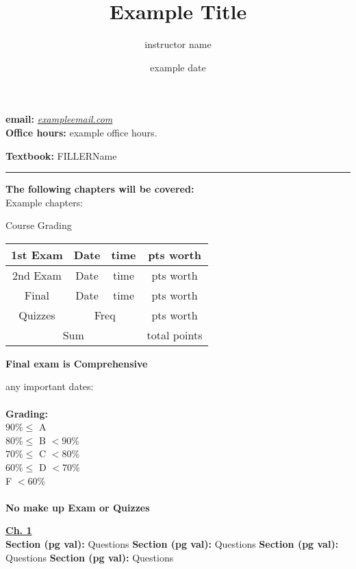 \documentclass[12pt, letterpaper]{article}
\title{Example Title}
\date{example date}
\author{instructor name}
\begin{document}
\maketitle

\textbf{email:} \href{mailto:exampleemail.com}{\color{blue}\emph{exampleemail.com}}\\
\textbf{Office hours:} example office hours.

\textbf{Textbook:} FILLERName\\
\noindent\rule{\textwidth}{0.4pt}

\textbf{The following chapters will be covered:} \\
Example chapters: 


\begin{center}
    Course Grading
    \begin{table}[hbt!]
        \centering
        \begin{tabular}{|c|c|c|c|}
            \hline
            1st Exam & Date & time & pts worth\\
            \hline
            2nd Exam & Date & time & pts worth\\
            \hline
            Final & Date & time & pts worth \\
            \hline
            Quizzes & \multicolumn{2}{|c|}{Freq} & pts worth\\
            \hline
            \multicolumn{3}{|c|}{Sum} & total points \\
            \hline
        \end{tabular}
    \end{table}
\end{center}

\textbf{Final exam is Comprehensive}

any important dates: \\~\\


\textbf{Grading:}\\
$90\% \leq$ A\\
$80\% \leq$ B $< 90\%$\\
$70\% \leq$ C $< 80\%$\\
$60\% \leq$ D $< 70\%$\\
F $< 60\%$ \\~\\
\textbf{No make up Exam or Quizzes}

\newpage 

{\large{}\underline{\textbf{Ch. 1}}}\\
\textbf{Section (pg val):} Questions
\textbf{Section (pg val):} Questions
\textbf{Section (pg val):} Questions
\textbf{Section (pg val):} Questions
\end{document}
